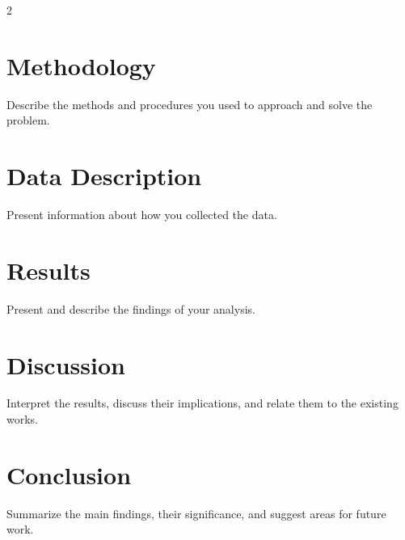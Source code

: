 \documentclass[12pt]{spieman}  %
\begin{document}
\begin{spacing}{2}
\section{Methodology}

Describe the methods and procedures you used to approach and solve the problem.

\section{Data Description}

Present information about how you collected the data.

\section{Results}

Present and describe the findings of your analysis.

\section{Discussion}

Interpret the results, discuss their implications, and relate them to the existing works.

\section{Conclusion}

Summarize the main findings, their significance, and suggest areas for future work.



\end{spacing}
\end{document}
